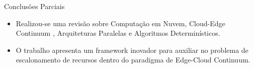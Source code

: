 \begin{frame}{Conclusões Parciais}
    \begin{itemize}
        \item Realizou-se uma revisão sobre Computação em Nuvem, Cloud-Edge Continuum , Arquiteturas Paralelas e Algoritmos Determinísticos.
        \item O trabalho apresenta um framework inovador para auxiliar no problema de escalonamento de recursos dentro do paradigma de Edge-Cloud Continuum.
    \end{itemize}
\end{frame}